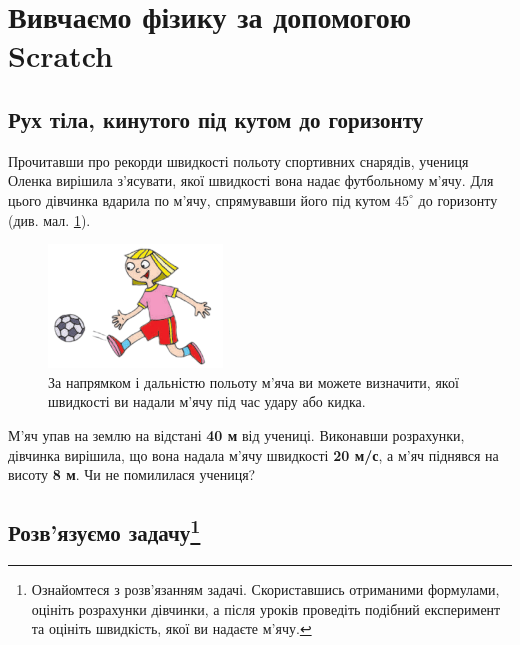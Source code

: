 \section{Вивчаємо фізику за допомогою Scratch}


\subsection{Рух тіла, кинутого під кутом до горизонту}

Прочитавши про рекорди швидкості польоту спортивних снарядів, учениця Оленка вирішила з’ясувати, якої швидкості вона надає футбольному м’ячу. Для цього дівчинка вдарила по м’ячу, спрямувавши його під кутом \textbf{$45^{\circ}$} до горизонту (див. мал. \ref{fig:hit1}).

\begin{figure}[h]
	\centering
	\includegraphics[width=0.3\linewidth]{./images-miziuk/hit1.png}
	\caption{
		\centering
		За напрямком і дальністю польоту м’яча ви можете визначити, якої швидкості ви надали м’ячу під час удару або кидка.}
	\label{fig:hit1}
\end{figure}

М’яч упав на землю на відстані \textbf{40 м} від учениці. Виконавши розрахунки, дівчинка вирішила, що вона надала м’ячу швидкості \textbf{20 м/с}, а м’яч піднявся на висоту \textbf{8 м}. Чи не помилилася учениця?

\subsection{Розв'язуємо задачу\protect\footnote{Ознайомтеся з розв’язанням задачі. Скориставшись отриманими формулами, оцініть розрахунки дівчинки, а після уроків проведіть подібний експеримент та оцініть швидкість, якої ви надаєте м’ячу.}}

